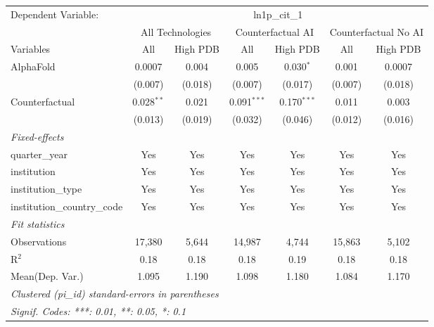 \begingroup
\centering
\begin{tabular}{lcccccc}
   \tabularnewline \midrule \midrule
   Dependent Variable: & \multicolumn{6}{c}{ln1p\_cit\_1}\\
 & \multicolumn{2}{c}{All Technologies} & \multicolumn{2}{c}{Counterfactual AI} & \multicolumn{2}{c}{Counterfactual No AI} \\
\cmidrule(lr){1-1}\cmidrule(lr){2-3} \cmidrule(lr){4-5} \cmidrule(lr){6-7}
Variables & \multicolumn{1}{c}{All} & \multicolumn{1}{c}{High PDB} & \multicolumn{1}{c}{All} & \multicolumn{1}{c}{High PDB} & \multicolumn{1}{c}{All} & \multicolumn{1}{c}{High PDB} \\
\cmidrule(lr){1-1}\cmidrule(lr){2-2} \cmidrule(lr){3-3} \cmidrule(lr){4-4} \cmidrule(lr){5-5} \cmidrule(lr){6-6} \cmidrule(lr){7-7}
   AlphaFold                    & 0.0007       & 0.004   & 0.005         & 0.030$^{*}$   & 0.001   & 0.0007\\   
                                & (0.007)      & (0.018) & (0.007)       & (0.017)       & (0.007) & (0.018)\\   
   Counterfactual               & 0.028$^{**}$ & 0.021   & 0.091$^{***}$ & 0.170$^{***}$ & 0.011   & 0.003\\   
                                & (0.013)      & (0.019) & (0.032)       & (0.046)       & (0.012) & (0.016)\\   
   \midrule
   \emph{Fixed-effects}\\
   quarter\_year                & Yes          & Yes     & Yes           & Yes           & Yes     & Yes\\  
   institution                  & Yes          & Yes     & Yes           & Yes           & Yes     & Yes\\  
   institution\_type            & Yes          & Yes     & Yes           & Yes           & Yes     & Yes\\  
   institution\_country\_code   & Yes          & Yes     & Yes           & Yes           & Yes     & Yes\\  
   \midrule
   \emph{Fit statistics}\\
   Observations                 & 17,380       & 5,644   & 14,987        & 4,744         & 15,863  & 5,102\\  
   R$^2$                        & 0.18         & 0.18    & 0.18          & 0.19          & 0.18    & 0.18\\  
Mean(Dep. Var.) & 1.095 & 1.190 & 1.098 & 1.180 & 1.084 & 1.170 \\
   \midrule \midrule
   \multicolumn{7}{l}{\emph{Clustered (pi\_id) standard-errors in parentheses}}\\
   \multicolumn{7}{l}{\emph{Signif. Codes: ***: 0.01, **: 0.05, *: 0.1}}\\
\end{tabular}
\par\endgroup
